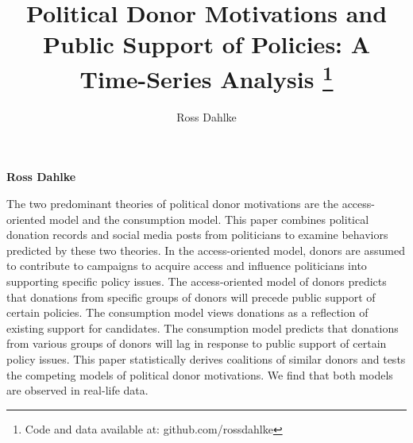 \documentclass[12pt,]{article}
\title{Political Donor Motivations and Public Support of Policies: A
Time-Series Analysis \thanks{Code and data available at: github.com/rossdahlke}  }
\author{\Large Ross Dahlke\vspace{0.05in} \newline\normalsize\emph{}  }
\date{}
\newcommand*{\authorfont}{\fontfamily{phv}\selectfont}
\renewenvironment{abstract}
 {{%
    \setlength{\leftmargin}{0mm}
    \setlength{\rightmargin}{\leftmargin}%
  }%
  \relax}
 {\endlist}
\begin{document}
	
%

{%
\setlength{\parindent}{0pt}
\thispagestyle{plain}
{\fontsize{18}{20}\selectfont\raggedright 
\maketitle  %

}

{
   \vskip 13.5pt\relax \normalsize\fontsize{11}{12} 
\textbf{\authorfont Ross Dahlke} \hskip 15pt \emph{\small }   

}

}








\begin{abstract}

    \hbox{\vrule height .2pt width 39.14pc}

    \vskip 8.5pt %

\noindent The two predominant theories of political donor motivations are the
access-oriented model and the consumption model. This paper combines
political donation records and social media posts from politicians to
examine behaviors predicted by these two theories. In the
access-oriented model, donors are assumed to contribute to campaigns to
acquire access and influence politicians into supporting specific policy
issues. The access-oriented model of donors predicts that donations from
specific groups of donors will precede public support of certain
policies. The consumption model views donations as a reflection of
existing support for candidates. The consumption model predicts that
donations from various groups of donors will lag in response to public
support of certain policy issues. This paper statistically derives
coalitions of similar donors and tests the competing models of political
donor motivations. We find that both models are observed in real-life
data.


    \hbox{\vrule height .2pt width 39.14pc}


\end{abstract}


\vskip -8.5pt


\end{document}
